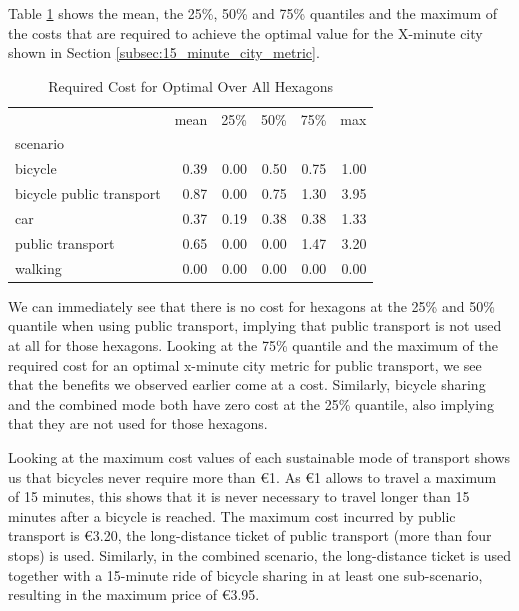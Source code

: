 Table \ref{tab:required_cost} shows the mean, the 25\%, 50\% and 75\% quantiles and the maximum of the costs that are required to achieve the optimal value for the X-minute city shown in Section \ref{subsec:15_minute_city_metric}.
\begin{table}
  \caption{Required Cost for Optimal Over All Hexagons}
  \label{tab:required_cost}
  \begin{center}
    \begin{tabular}{lrrrrr}
     & mean & 25\% & 50\% & 75\% & max \\
    scenario &  &  &  &  &  \\
    bicycle & 0.39 & 0.00 & 0.50 & 0.75 & 1.00 \\
    bicycle public transport & 0.87 & 0.00 & 0.75 & 1.30 & 3.95 \\
    car & 0.37 & 0.19 & 0.38 & 0.38 & 1.33 \\
    public transport & 0.65 & 0.00 & 0.00 & 1.47 & 3.20 \\
    walking & 0.00 & 0.00 & 0.00 & 0.00 & 0.00 \\
    \end{tabular}
  \end{center}
\end{table}
We can immediately see that there is no cost for hexagons at the 25\% and 50\% quantile when using public transport, implying that public transport is not used at all for those hexagons.
Looking at the 75\% quantile and the maximum of the required cost for an optimal x-minute city metric for public transport, we see that the benefits we observed earlier come at a cost.
Similarly, bicycle sharing and the combined mode both have zero cost at the 25\% quantile, also implying that they are not used for those hexagons.

Looking at the maximum cost values of each sustainable mode of transport shows us that bicycles never require more than \euro{1}.
As \euro{1} allows to travel a maximum of 15 minutes, this shows that it is never necessary to travel longer than 15 minutes after a bicycle is reached.
The maximum cost incurred by public transport is \euro{3.20}, the long-distance ticket of public transport (more than four stops) is used.
Similarly, in the combined scenario, the long-distance ticket is used together with a 15-minute ride of bicycle sharing in at least one sub-scenario, resulting in the maximum price of \euro{3.95}.

